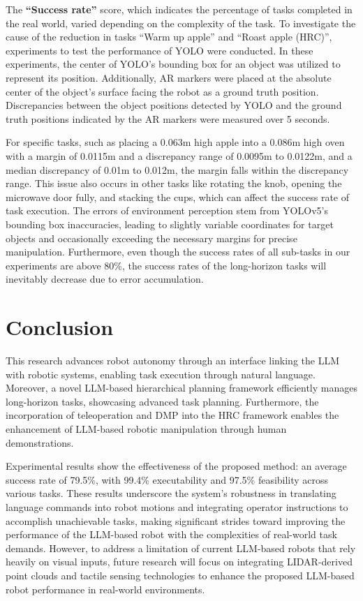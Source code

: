 \documentclass[letterpaper,conference]{ieeeconf}
\begin{document}
The \textbf{``Success rate''} score, which indicates the percentage of tasks completed in the real world, varied depending on the complexity of the task.
To investigate the cause of the reduction in tasks ``Warm up apple'' and ``Roast apple (HRC)'', experiments to test the performance of YOLO were conducted. In these experiments, the center of YOLO's bounding box for an object was utilized to represent its position. Additionally, AR markers were placed at the absolute center of the object's surface facing the robot as a ground truth position. Discrepancies between the object positions detected by YOLO and the ground truth positions indicated by the AR markers were measured over 5 seconds.

For specific tasks, such as placing a 0.063m high apple into a 0.086m high oven with a margin of 0.0115m and a discrepancy range of 0.0095m to 0.0122m, and a median discrepancy of 0.01m to 0.012m, the margin falls within the discrepancy range. This issue also occurs in other tasks like rotating the knob, opening the microwave door fully, and stacking the cups, which can affect the success rate of task execution. The errors of environment perception stem from YOLOv5's bounding box inaccuracies, leading to slightly variable coordinates for target objects and occasionally exceeding the necessary margins for precise manipulation.
Furthermore, even though the success rates of all sub-tasks in our experiments are above 80\%, the success rates of the long-horizon tasks will inevitably decrease due to error accumulation.
\vspace{-2mm}

\section{Conclusion}
This research advances robot autonomy through an interface linking the LLM with robotic systems, enabling task execution through natural language. Moreover, a novel LLM-based hierarchical planning framework efficiently manages long-horizon tasks, showcasing advanced task planning.
Furthermore, the incorporation of teleoperation and DMP into the HRC framework enables the enhancement of LLM-based robotic manipulation through human demonstrations.

Experimental results show the effectiveness of the proposed method: an average success rate of 79.5\%, with 99.4\% executability and 97.5\% feasibility across various tasks. 
These results underscore the system's robustness in translating language commands into robot motions and integrating operator instructions to accomplish unachievable tasks, making significant strides toward improving the performance of the LLM-based robot with the complexities of real-world task demands.
However, to address a limitation of current LLM-based robots that rely heavily on visual inputs, future research will focus on integrating LIDAR-derived point clouds and tactile sensing technologies to enhance the proposed LLM-based robot performance in real-world environments.
\vspace{-2mm}


\end{document}
